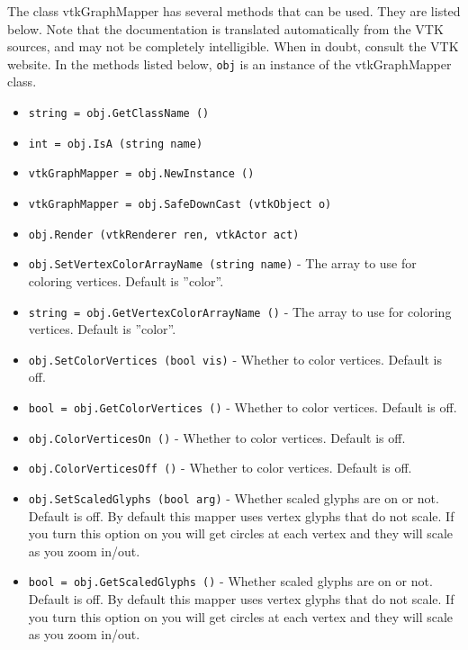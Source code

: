 The class vtkGraphMapper has several methods that can be used.
  They are listed below.
Note that the documentation is translated automatically from the VTK sources,
and may not be completely intelligible.  When in doubt, consult the VTK website.
In the methods listed below, \verb|obj| is an instance of the vtkGraphMapper class.
\begin{itemize}
\item  \verb|string = obj.GetClassName ()|

\item  \verb|int = obj.IsA (string name)|

\item  \verb|vtkGraphMapper = obj.NewInstance ()|

\item  \verb|vtkGraphMapper = obj.SafeDownCast (vtkObject o)|

\item  \verb|obj.Render (vtkRenderer ren, vtkActor act)|

\item  \verb|obj.SetVertexColorArrayName (string name)| -  The array to use for coloring vertices.  Default is ''color''.

\item  \verb|string = obj.GetVertexColorArrayName ()| -  The array to use for coloring vertices.  Default is ''color''.

\item  \verb|obj.SetColorVertices (bool vis)| -  Whether to color vertices.  Default is off.

\item  \verb|bool = obj.GetColorVertices ()| -  Whether to color vertices.  Default is off.

\item  \verb|obj.ColorVerticesOn ()| -  Whether to color vertices.  Default is off.

\item  \verb|obj.ColorVerticesOff ()| -  Whether to color vertices.  Default is off.

\item  \verb|obj.SetScaledGlyphs (bool arg)| -  Whether scaled glyphs are on or not.  Default is off.
 By default this mapper uses vertex glyphs that do not
 scale. If you turn this option on you will get circles
 at each vertex and they will scale as you zoom in/out.

\item  \verb|bool = obj.GetScaledGlyphs ()| -  Whether scaled glyphs are on or not.  Default is off.
 By default this mapper uses vertex glyphs that do not
 scale. If you turn this option on you will get circles
 at each vertex and they will scale as you zoom in/out.


\end{itemize}
